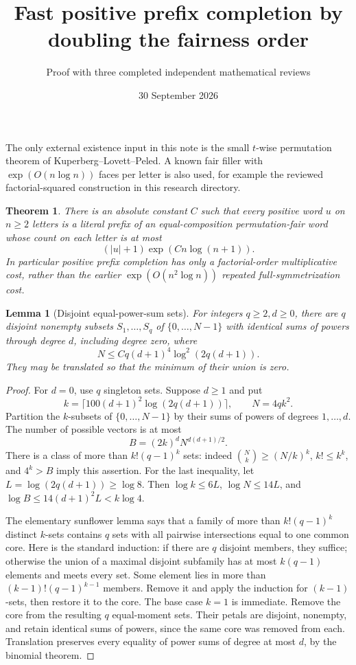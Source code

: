 \documentclass[11pt]{article}
\title{Fast positive prefix completion by doubling the fairness order}
\author{Proof with three completed independent mathematical reviews}
\date{30 September 2026}
\newtheorem{theorem}{Theorem}
\newtheorem{lemma}{Lemma}
\begin{document}
\maketitle
The only external existence input in this note is the small $t$-wise
permutation theorem of Kuperberg--Lovett--Peled. A known fair filler with
$\exp(O(n\log n))$ faces per letter is also used, for example the
reviewed factorial-squared construction in this research directory.

\begin{theorem}\label{main}
There is an absolute constant $C$ such that every positive word $u$ on
$n\ge2$ letters is a literal prefix of an equal-composition
permutation-fair word whose count on each letter is at most
\[
 (|u|+1)\exp(Cn\log(n+1)).
\]
In particular positive prefix completion has only a factorial-order
multiplicative cost, rather than the earlier
$\exp(O(n^2\log n))$ repeated full-symmetrization cost.
\end{theorem}

\begin{lemma}[Disjoint equal-power-sum sets]\label{moments}
For integers $q\ge2,d\ge0$, there are $q$ disjoint nonempty subsets
$S_1,\ldots,S_q$ of $\{0,\ldots,N-1\}$ with identical sums of powers
through degree $d$, including degree zero, where
\[
 N\le Cq(d+1)^4\log^2(2q(d+1)).
\]
They may be translated so that the minimum of their union is zero.
\end{lemma}
\begin{proof}
For $d=0$, use $q$ singleton sets. Suppose $d\ge1$ and put
\[
 k=\lceil100(d+1)^2\log(2q(d+1))\rceil,\qquad N=4qk^2.
\]
Partition the $k$-subsets of $\{0,\ldots,N-1\}$ by their sums of powers
of degrees $1,\ldots,d$. The number of possible vectors is at most
\[
 B=(2k)^dN^{d(d+1)/2}.
\]
There is a class of more than $k!(q-1)^k$ sets: indeed
$\binom Nk\ge(N/k)^k$, $k!\le k^k$, and $4^k>B$ imply this assertion.
For the last inequality, let $L=\log(2q(d+1))\ge\log8$.
Then $\log k\le6L$, $\log N\le14L$, and
$\log B\le14(d+1)^2L<k\log4$.

The elementary sunflower lemma says that a family of more than
$k!(q-1)^k$ distinct $k$-sets contains $q$ sets with all pairwise
intersections equal to one common core. Here is the standard induction:
if there are $q$ disjoint members, they suffice; otherwise the union
of a maximal disjoint subfamily has at most $k(q-1)$ elements and
meets every set. Some element lies in more than
$(k-1)!(q-1)^{k-1}$ members. Remove it and apply the induction for
$(k-1)$-sets, then restore it to the core. The base case $k=1$ is
immediate.
Remove the core from the resulting $q$ equal-moment sets.
Their petals are disjoint, nonempty, and retain identical sums of
powers, since the same core was removed from each.
Translation preserves every equality of power sums of degree at most
$d$, by the binomial theorem.
\end{proof}
\end{document}
